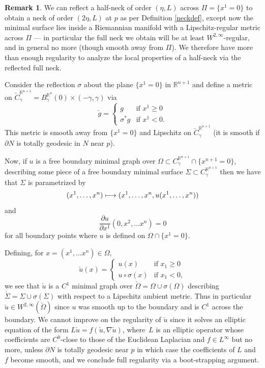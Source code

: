 \documentclass[10pt]{amsart}
\newcounter{cas}
\newcommand{\mto}{\mathchoice{\longmapsto}{\mapsto}{\mapsto}{\mapsto}}
\theoremstyle{definition}
\newtheorem{rmk}[thm]{Remark}
\newcommand{\R}{\mathbb{R}}
\let\D\nabla
\begin{document}
\begin{rmk}\label{rmk_reflection}
We can reflect a half-neck of order $(\eta, L)$ across $\Pi=\{x^1 =0\}$ to obtain a neck of order $(2\eta, L)$ at $p$ as per Definition \ref{neckdef}, except now the minimal surface lies inside a Riemannian manifold with a Lipschitz-regular metric across $\Pi$ --- in particular the full neck we obtain will be at least $W^{2,\infty}$-regular, and in general no more (though smooth away from $\Pi$). We therefore have more than enough regularity to analyze the local properties of a half-neck via the reflected full neck.

Consider the reflection $\sigma$ about the plane $\{x^1=0\}$ in $\R^{n+1}$ and define a metric on $\check{C}^{\R^{n+1}}_{\gamma}=B_\gamma^{\R^n}(0)\times (-\gamma,\gamma)$ via
$$
\check{g} = \begin{cases}
g&\text{if }x^1\geq 0\\
\sigma^{\ast}g&\text{if }x^1<0.
\end{cases}
$$
This metric is smooth away from $\{x^1=0\}$ and Lipschitz on $\check{C}^{\R^{n+1}}_{\gamma}$ (it is smooth if $\partial N$ is totally geodesic in $N$ near $p$).

Now, if $u$ is a free boundary minimal graph over $\Omega \subset C^{\R^{n+1}}_{\gamma}\cap \{x^{n+1}=0\}$, describing some piece of a free boundary minimal surface $\Sigma \subset C^{\R^{n+1}}_{\gamma}$ then we have that $\Sigma$ is parametrized by
$$(x^1,\dots,x^n)\mto (x^1,\dots, x^n, u(x^1,\dots , x^n))$$
and
$$\frac{\partial u}{\partial x^1}(0,x^2,\dots x^n) = 0$$
for all boundary points where $u$ is defined \ie on $\Omega\cap \{x^1 = 0\}$.

Defining, for $x=(x^1,\dots x^n)\in \Omega$,
$$
\check{u}(x) =\begin{cases}
u(x)&\text{if }x_1\geq 0\\
u\circ \sigma (x)&\text{if }x_1<0,
\end{cases}
$$
we see that $\check{u}$ is a $C^1$ minimal graph over $\check{\Omega}=\Omega\cup \sigma(\Omega)$ describing $\check{\Sigma} = \Sigma\cup \sigma(\Sigma)$ with respect to a Lipschitz ambient metric. Thus in particular $\check{u}\in W^{2,\infty} (\check{\Omega})$ since $u$ was smooth up to the boundary and is $C^1$ across the boundary. We cannot improve on the regularity of $\check{u}$ since it solves an elliptic equation of the form $L\check{u}=f(\check{u},\D \check{u})$, where~$L$ is an elliptic operator whose coefficients are $C^0$-close to those of the Euclidean Laplacian and $f\in L^\infty$ but no more, unless $\partial N$ is totally geodesic near $p$ in which case the coefficients of $L$ and $f$ become smooth, and we conclude full regularity via a boot-strapping argument.
\end{rmk}
\end{document}
